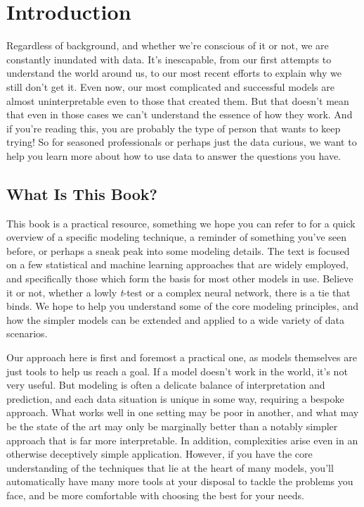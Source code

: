 \documentclass[
  letterpaper,
]{krantz}
\begin{document}

\chapter*{Introduction}\label{introduction}



Regardless of background, and whether we're conscious of it or not, we
are constantly inundated with data. It's inescapable, from our first
attempts to understand the world around us, to our most recent efforts
to explain why we still don't get it. Even now, our most complicated and
successful models are almost uninterpretable even to those that created
them. But that doesn't mean that even in those cases we can't understand
the essence of how they work. And if you're reading this, you are
probably the type of person that wants to keep trying! So for seasoned
professionals or perhaps just the data curious, we want to help you
learn more about how to use data to answer the questions you have.

\section*{What Is This Book?}\label{what-is-this-book}


This book is a practical resource, something we hope you can refer to
for a quick overview of a specific modeling technique, a reminder of
something you've seen before, or perhaps a sneak peak into some modeling
details. The text is focused on a few statistical and machine learning
approaches that are widely employed, and specifically those which form
the basis for most other models in use. Believe it or not, whether a
lowly \emph{t}-test or a complex neural network, there is a tie that
binds. We hope to help you understand some of the core modeling
principles, and how the simpler models can be extended and applied to a
wide variety of data scenarios.

Our approach here is first and foremost a practical one, as models
themselves are just tools to help us reach a goal. If a model doesn't
work in the world, it's not very useful. But modeling is often a
delicate balance of interpretation and prediction, and each data
situation is unique in some way, requiring a bespoke approach. What
works well in one setting may be poor in another, and what may be the
state of the art may only be marginally better than a notably simpler
approach that is far more interpretable. In addition, complexities arise
even in an otherwise deceptively simple application. However, if you
have the core understanding of the techniques that lie at the heart of
many models, you'll automatically have many more tools at your disposal
to tackle the problems you face, and be more comfortable with choosing
the best for your needs.
\end{document}
